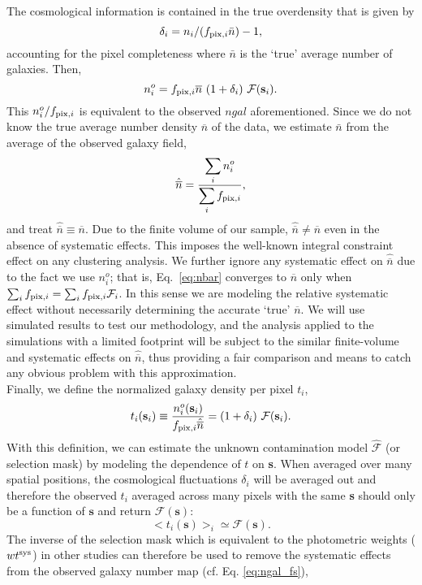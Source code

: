 \documentclass[fleqn, usenatbib]{mnras}
\begin{document}
The cosmological information is contained in the true overdensity that is given by
\begin{equation}
\delta_{i} = n_i/(f_{{\rm pix},i}\bar{n})-1,\label{eq:overden}
\end{equation}
accounting for the pixel completeness where $\bar{n}$ is the `true' average number of galaxies. Then,
\begin{equation}
n_{i}^{o}= f_{{\rm pix},i}\overline{n}~(1 + \delta_{i})~ \mathcal{F}(\textbf{s}_{i}).\label{eq:nobsi}
\end{equation}
This $n_{i}^{o}/f_{{\rm pix},i}$ is equivalent to the observed $ngal$ aforementioned.
Since we do not know the true average number density $\overline{n}$ of the data, we estimate $\bar{n}$ from the average of the observed galaxy field,
\begin{equation}\label{eq:nbar}
\hat{\overline{n}} = \frac{\displaystyle\sum_{i} n^{o}_{i}  }{\displaystyle\sum_{i} f_{{\rm pix},i}},
\end{equation}
and treat $\hat{\overline{n}} \equiv \overline{n}$.
Due to the finite volume of our sample, $\hat{\overline{n}} \neq \overline{n}$ even in the absence of systematic effects. This imposes the well-known integral constraint effect on any clustering analysis. We further ignore any systematic effect on $\hat{\overline{n}}$ due to the fact we use $n^{o}_{i}$; that is, Eq.~\ref{eq:nbar} converges to $\overline{n}$ only when $\sum_{i} f_{{\rm pix},i}= \sum_{i} f_{{\rm pix},i}\mathcal{F}_i$. 
In this sense we are modeling the relative systematic effect without necessarily determining the accurate `true' $\overline{n}$. We will use simulated results to test our methodology, and the analysis applied to the simulations with a limited footprint will be subject to the similar finite-volume and systematic effects on $\hat{\overline{n}}$, thus providing a fair comparison and means to catch any obvious problem with this approximation.\\

Finally, we define the normalized galaxy density per pixel $t_{i}$,
\begin{equation}\label{eq:nnbar}
    t_{i}(\textbf{s}_{i}) \equiv \frac{n_{i}^{o}(\textbf{s}_{i})}{f_{{\rm pix},i}\hat{\overline{n}}} = (1+\delta_{i}) ~ \mathcal{F}(\textbf{s}_{i}).
\end{equation}
With this definition, we can estimate the unknown contamination model $\hat{\mathcal{F}}$ (or selection mask) by modeling the dependence of $t$ on \textbf{s}. When averaged over many spatial positions, the cosmological fluctuations $\delta_i$ will be averaged out and therefore the observed $t_i$ averaged across many pixels with the same \textbf{s} should only be a function of $\textbf{s}$ and return $\mathcal{F}(\textbf{s})$:
\begin{equation}\label{eq:tfs}
    <t_{i}(\textbf{s})>_i  \simeq {\mathcal{F}}(\textbf{s}).
\end{equation}
The inverse of the selection mask which is equivalent to the photometric weights ($wt^{{\rm sys}}$) in other studies can therefore be used to remove the systematic effects from the observed galaxy number map (cf. Eq. \ref{eq:ngal_fs}),
\end{document}
